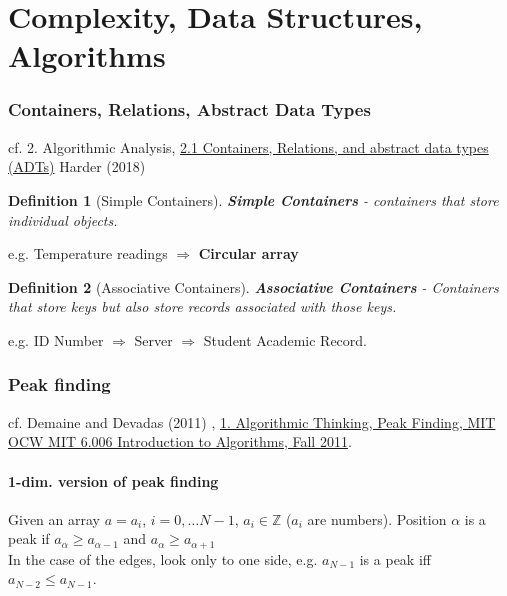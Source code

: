 \documentclass[10pt]{amsart}
\newtheorem{definition}{Definition}
\begin{document}
\part{Complexity, Data Structures, Algorithms}

\section{Containers, Relations, Abstract Data Types}

cf. 2. Algorithmic Analysis, \href{https://ece.uwaterloo.ca/~dwharder/aads/Lecture_materials/2.01.Containers_relations_ADTs.pptx}{2.1 Containers, Relations, and abstract data types (ADTs)} Harder (2018) \cite{Hard2018}

\begin{definition}[Simple Containers]
	\textbf{Simple Containers} - containers that store individual objects.
\end{definition} 
e.g. Temperature readings $\Longrightarrow$ \textbf{Circular array}

\begin{definition}[Associative Containers]
	\textbf{Associative Containers} - Containers that store keys but also store records associated with those keys.
\end{definition} 
e.g. ID Number $\Longrightarrow $ Server $\Longrightarrow$ Student Academic Record.



\section{Peak finding}

cf. Demaine and Devadas (2011) \cite{DeDe2001}, \href{https://youtu.be/HtSuA80QTyo}{1. Algorithmic Thinking, Peak Finding, MIT OCW MIT 6.006 Introduction to Algorithms, Fall 2011}. 

\subsection{1-dim. version of peak finding}

Given an array $a= a_i$, $i=0, \dots N-1$, $a_i \in \mathbb{Z}$ ($a_i$ are numbers). Position $\alpha$ is a peak if $a_{\alpha} \geq a_{\alpha-1}$ and $a_{\alpha} \geq a_{\alpha + 1}$ \\

In the case of the edges, look only to one side, e.g. $a_{N-1}$ is a peak iff $a_{N-2} \leq a_{N-1}$. \\
\end{document}
